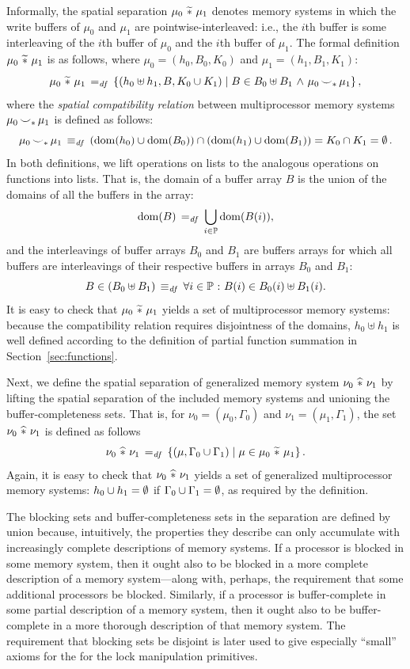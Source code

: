 \documentclass[11pt]{report}
\begin{document}
Informally, the spatial separation $\mu_0 \operatorname{\,\widetilde{\ast}\,} \mu_1$ denotes memory systems in which the write buffers of $\mu_0$ and $\mu_1$ are pointwise-interleaved: i.e., the $i$th buffer is some interleaving of the $i$th buffer of $\mu_0$ and the $i$th buffer of $\mu_1$. The formal definition $\mu_0 \operatorname{\,\widetilde{\ast}\,} \mu_1$ is as follows, where $\mu_0 = (h_0,B_0,K_0)$ and $\mu_1 = (h_1,B_1,K_1)$: \[ \mu_0 \operatorname{\,\widetilde{\ast}\,} \mu_1 \operatorname{\;=_{\mathit{df}}\;} \left\lbrace (h_0 \uplus h_1, B, K_0 \cup K_1) \mid B \in B_0 \uplus B_1 \operatorname{\,\wedge\,} \mu_0 \operatorname{\smile}_\ast \mu_1 \right\rbrace,\] where the \emph{spatial compatibility relation} between multiprocessor memory systems $\mu_0 \operatorname{\smile}_\ast \mu_1$ is defined as follows: \[ \mu_0 \operatorname{\smile}_\ast \mu_1 \operatorname{\;\equiv_{\mathit{df}}\;} \left(\operatorname{\mathrm{dom}}(h_0) \cup \operatorname{\mathrm{dom}}(B_0) \right) \cap \left( \operatorname{\mathrm{dom}}(h_1) \cup \operatorname{\mathrm{dom}}(B_1) \right) = K_0 \cap K_1 = \operatorname{\emptyset}.\] In both definitions, we lift operations on lists to the analogous operations on functions into lists. That is, the domain of a buffer array $B$ is the union of the domains of all the buffers in the array:  \[ \operatorname{\mathrm{dom}}(B) \operatorname{\;=_{\mathit{df}}\;} \bigcup_{i \in \mathbb{P}} \operatorname{\mathrm{dom}}(B(i)),\] and the interleavings of buffer arrays $B_0$ and $B_1$ are buffers arrays for which all buffers are interleavings of their respective buffers in arrays $B_0$ and $B_1$: \[ B \in (B_0 \uplus B_1) \operatorname{\;\equiv_{\mathit{df}}\;} \forall i \in \mathbb{P} \operatorname{\,:\,} B(i) \in B_0(i) \uplus B_1(i).\] It is easy to check that $\mu_0 \operatorname{\,\widetilde{\ast}\,} \mu_1$ yields a set of multiprocessor memory systems: because the compatibility relation requires disjointness of the domains, $h_0 \uplus h_1$ is well defined according to the definition of partial function summation in Section~\ref{sec:functions}. 

Next, we define the spatial separation of generalized memory system $\nu_0 \operatorname{\,\widehat{\ast}\,} \nu_1$ by lifting the spatial separation of the included memory systems and unioning the buffer-completeness sets. That is, for $\nu_0 = (\mu_0,\Gamma_0)$ and $\nu_1 = (\mu_1,\Gamma_1)$, the set $\nu_0 \operatorname{\,\widehat{\ast}\,} \nu_1$ is defined as follows \[ \nu_0 \operatorname{\,\widehat{\ast}\,} \nu_1 \operatorname{\;=_{\mathit{df}}\;} \left\lbrace (\mu,\Gamma_0 \cup \Gamma_1) \mid \mu \in \mu_0 \operatorname{\,\widetilde{\ast}\,} \mu_1 \right\rbrace.\] Again, it is easy to check that $\nu_0 \operatorname{\,\widehat{\ast}\,} \nu_1$ yields a set of generalized multiprocessor memory systems: $h_0 \cup h_1 = \operatorname{\emptyset}$ if $\Gamma_0 \cup \Gamma_1 = \operatorname{\emptyset}$, as required by the definition. 

The blocking sets and buffer-completeness sets in the separation are defined by union because, intuitively, the properties they describe can only accumulate with increasingly complete descriptions of memory systems. If a processor is blocked in some memory system, then it ought also to be blocked in a more complete description of a memory system---along with, perhaps, the requirement that some additional processors be blocked. Similarly, if a processor is buffer-complete in some partial description of a memory system, then it ought also to be buffer-complete in a more thorough description of that memory system. The requirement that blocking sets be disjoint is later used to give especially ``small'' axioms for the for the lock manipulation primitives. 
\end{document}
